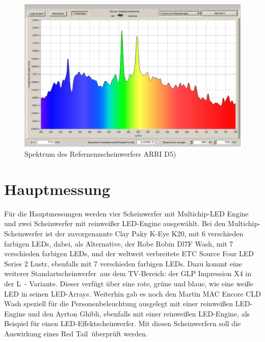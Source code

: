 \begin{figure}[H]     %
\centering
\includegraphics[width=1.0\textwidth]{bilder/ref} 
\caption {Spektrum des Refernenzscheinwerfers ARRI D5)}\label{b_ref}
\end{figure}


\chapter{Hauptmessung}

Für die Hauptmessungen werden vier Scheinwerfer mit Multichip-LED Engine und zwei Scheinwerfer mit reinweißer LED-Engine ausgewählt. Bei den Multichip-Scheinwerfer ist der zuvorgenannte Clay Paky K-Eye K20, mit 6 verschieden farbigen LEDs, dabei, als Alternative, der Robe Robin Dl7F Wash, mit 7 verschieden farbigen LEDs, und der weltweit verbreitete ETC Source Four LED Series 2 Lustr, ebenfalls mit 7 verschieden farbigen LEDs. Dazu kommt eine weiterer \glqq Standartscheinwerfer\grqq\ aus dem TV-Bereich: der GLP Impression X4 in der \glqq L\grqq\ - Variante. Dieser verfügt über eine rote, grüne und blaue, wie eine weiße LED in seinen LED-Arrays. Weiterhin gab es noch den Martin MAC Encore CLD Wash speziell für die Personenbeleuchtung ausgelegt mit einer reinweißen LED-Engine und den Ayrton Ghibli, ebenfalls mit einer reinweißen LED-Engine, als Beispiel für einen LED-Effektscheinwerfer. 
Mit diesen Scheinwerfern soll die Auswirkung eines \glqq Red Tail\grqq\ überprüft werden.



